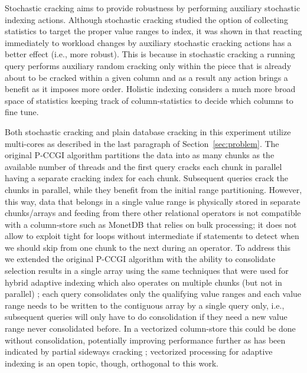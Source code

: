 Stochastic cracking aims to provide robustness by performing auxiliary stochastic indexing actions.
Although stochastic cracking studied the option of collecting statistics to target the proper value ranges to index, 
it was shown in \cite{DBLP:journals/pvldb/HalimIKY12} that reacting immediately to workload changes by auxiliary 
stochastic cracking actions has a better effect (i.e., more robust).
This is because in stochastic cracking a running query performs auxiliary random cracking only within the piece that is already about to be cracked
within a given column and as a result any action brings a benefit as it imposes more order. Holistic indexing considers a much more broad space of statistics
keeping track of column-statistics to decide which columns to fine tune. 

Both stochastic cracking and plain database cracking in this experiment utilize 
multi-cores as described in the last paragraph of Section~\ref{sec:problem}.
The original P-CCGI algorithm partitions the data into as many chunks as the available number of threads and 
the first query cracks each chunk in parallel having a separate cracking index for each chunk.
Subsequent queries crack the chunks in parallel, while they benefit from the initial range partitioning.
However, this way, data that belongs in a single value range is physically stored in separate chunks/arrays 
and feeding from there other relational operators is not compatible with a column-store such as MonetDB  that relies on bulk processing;
it does not allow to exploit tight for loops without intermediate if statements to detect when we should skip from one chunk to the next during an operator. 
To address this we extended the original P-CCGI algorithm \cite{multicore_adaptive} with the ability to consolidate selection results in a single array
using the same techniques that were used for hybrid adaptive indexing which also operates on multiple chunks (but not in parallel) 
\cite{DBLP:journals/pvldb/IdreosMKG11}; each query
consolidates only the qualifying value ranges and each value range needs to be written to the contiguous array by a single query only, 
i.e., subsequent queries will only have to do consolidation if they need a new value range never consolidated before.
In a vectorized column-store this could be done without consolidation, potentially improving performance further
as has been indicated by partial sideways cracking \cite{DBLP:conf/sigmod/IdreosKM09};
vectorized processing for adaptive indexing is an open topic, though, orthogonal to this work.

